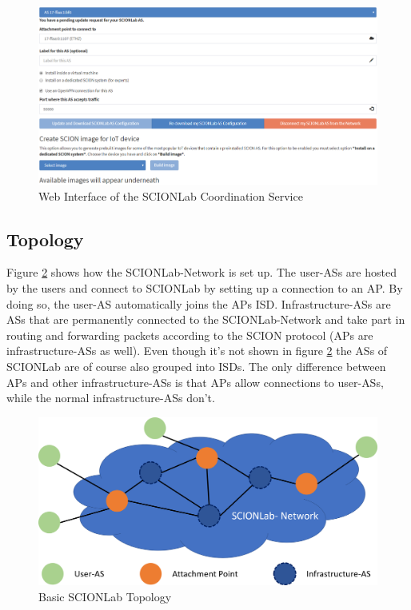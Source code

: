 \begin{figure}[h]
	\centering
	\includegraphics[width=\textwidth]{img/SCIONLab_Coordination_Service.png}
	\caption{Web Interface of the SCIONLab Coordination Service }
	\label{SCIONLab Coordination Service}
\end{figure}

\newpage

\subsection{Topology}

Figure \ref{Basic SCIONLab Topology} shows how the \acs{SCIONLab}-Network is set up. The user-\acsp{AS} are hosted by the users and connect to \acs{SCIONLab} by setting up a connection to an \acs{AP}. By doing so, the user-\acs{AS} automatically joins the \acl{AP}s \acs{ISD}. Infrastructure-\acsp{AS} are \acsp{AS} that are permanently connected to the \acs{SCIONLab}-Network and take part in routing and forwarding packets according to the \acs{SCION} protocol (\acsp{AP} are infrastructure-\acsp{AS} as well). Even though it's not shown in figure \ref{Basic SCIONLab Topology} the \acsp{AS} of \acs{SCIONLab} are of course also grouped into \acsp{ISD}. The only difference between \aclp{AP} and other infrastructure-\acsp{AS} is that \acsp{AP} allow connections to user-\acsp{AS}, while the normal infrastructure-\acsp{AS} don't.

\begin{figure}[h]
	\centering
	\includegraphics[width =\textwidth]{img/SCIONLab-Topology.png}
	\caption{Basic SCIONLab Topology}
	\label{Basic SCIONLab Topology}
\end{figure}
